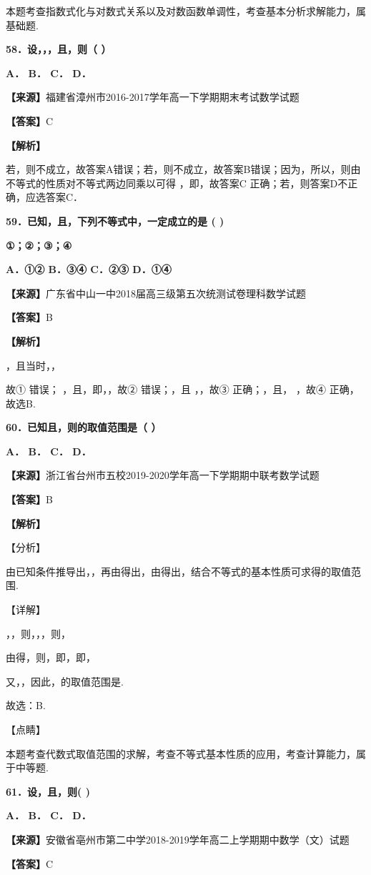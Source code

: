 \documentclass[
]{article}
\begin{document}
本题考查指数式化与对数式关系以及对数函数单调性，考查基本分析求解能力，属基础题.

\textbf{58．设，，，且，则（ ）}

\textbf{A． B． C． D．}

\textbf{【来源】}福建省漳州市2016-2017学年高一下学期期末考试数学试题

\textbf{【答案】}C

\textbf{【解析】}

若，则不成立，故答案A错误；若，则不成立，故答案B错误；因为，所以，则由不等式的性质对不等式两边同乘以可得
，即，故答案C 正确；若，则答案D不正确，应选答案C．

\textbf{59．已知，且，下列不等式中，一定成立的是 ( )}

\textbf{①；②；③；④}

\textbf{A．①② B．③④ C．②③ D．①④}

\textbf{【来源】}广东省中山一中2018届高三级第五次统测试卷理科数学试题

\textbf{【答案】}B

\textbf{【解析】}

，且当时，，

故① 错误； ，且，即，，故② 错误；，且 ，，故③ 正确；，且， ，故④
正确，故选B.

\textbf{60．已知且，则的取值范围是（ ）}

\textbf{A． B． C． D．}

\textbf{【来源】}浙江省台州市五校2019-2020学年高一下学期期中联考数学试题

\textbf{【答案】}B

\textbf{【解析】}

【分析】

由已知条件推导出，，再由得出，由得出，结合不等式的基本性质可求得的取值范围.

【详解】

，，则，，，则，

由得，则，即，即，

又，，因此，的取值范围是.

故选：B.

【点睛】

本题考查代数式取值范围的求解，考查不等式基本性质的应用，考查计算能力，属于中等题.

\textbf{61．设，且，则( )}

\textbf{A． B． C． D．}

\textbf{【来源】}安徽省亳州市第二中学2018-2019学年高二上学期期中数学（文）试题

\textbf{【答案】}C
\end{document}
